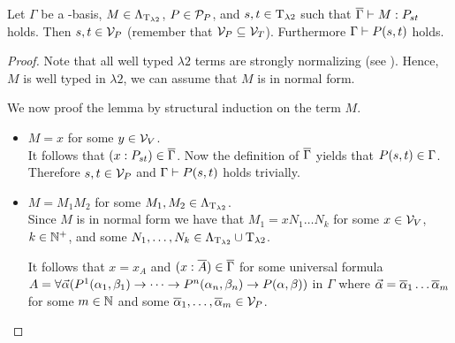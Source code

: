 \begin{lemma}\label{l2h}
Let $\Gamma$ be a \SysP-basis, $M\in\Lambda_{\text{T}_{\lambda2}}$, $P\in\mathcal{P}_P$, and $\predTFst,\predTSnd\in\lambdaTypes$ such that $\trans{\Gamma}\lambdaModels M:\code{P}{\predTFst}{\predTSnd}$ holds.
Then $\predTFst, \predTSnd\in\VarP$ (remember that $\mathcal{V}_P\subseteq\mathcal{V}_T$). Furthermore $\Gamma\PModels P(\predTFst,\predTSnd)$ holds.
\end{lemma}
\begin{proof}
Note that all well typed $\lambda2$ terms are strongly normalizing (see %
). Hence, $M$ is well typed in $\lambda2$, we can assume that $M$ is in normal form. %

We now proof the lemma by structural induction on the term $M$.
\begin{itemize}
	\item[] \underline{$M=x$} for some $y\in\mathcal{V}_V$.\\
		It follows that $(x:\code{P}{\predTFst}{\predTSnd})\in\trans{\Gamma}$.
		Now the definition of $\overline{\Gamma}$ yields that $P(\predTFst,\predTSnd)\in\Gamma$. Therefore $\predTFst,\predTSnd\in\VarP$ and $\Gamma\vdash P(s,t)$ holds trivially.
	\item[] \underline{$M=M_1M_2$} for some $M_1,M_2\in\Lambda_{\text{T}_{\lambda2}}$.\\
		Since $M$ is in normal form we have that $M_1=xN_1\dots N_k$ for some $x\in\mathcal{V}_V$, $k\in\mathbb{N}^+$, and some $N_1,\dots,N_k\in\Lambda_{\text{T}_{\lambda2}}\cup\text{T}_{\lambda2}$. %
		
		It follows that $x=x_A$ and $(x:\overline{A})\in\overline{\Gamma}$ for some universal formula $A=\forall\predVec(P^1(\predFst[1],\predSnd[1])\to\dots\to P^n(\predFst[n],\predSnd[n])\to P(\predFst,\predSnd))$ in $\Gamma$ where $\predVec=\predVec[1]\dots\predVec[m]$ for some $m\in\mathbb{N}$ and some $\predVec[1],\dots,\predVec[m]\in\VarP$.
		


\end{itemize}
\end{proof}
